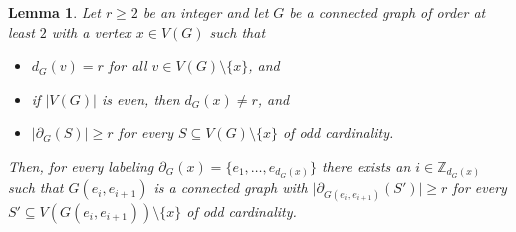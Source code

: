 \documentclass[a4paper,11pt]{article}
\newtheorem{lem}[defi]{Lemma}
\theoremstyle{remark}
\begin{document}
\begin{lem}\label{Lem:r-graph lifting}
	Let $ r \geq 2$ be an integer and let $G$ be a connected graph of order at least $ 2 $ with a vertex $x \in V(G)$ such that
	\begin{itemize}
		\item $d_G(v)=r$ for all $v \in V(G)\setminus\{x\}$, and
		\item if $\vert V(G) \vert$ is even, then $d_G(x)\neq r$, and
		\item $\vert \partial_G(S) \vert \geq r$ for every $S\subseteq V(G)\setminus\{x\}$ of odd cardinality.
	\end{itemize}
	Then, for every labeling $\partial_G(x)=\{e_1,\ldots, e_{d_G(x)}\}$ there exists an  $i \in \mathbb{Z}_{d_G(x)}$ such that $G(e_i,e_{i+1})$ is a connected graph with $\vert \partial_{G(e_i,e_{i+1})}(S') \vert \geq r$ for every $S'\subseteq V(G(e_i,e_{i+1}))\setminus\{x\}$ of odd cardinality.
\end{lem}
\end{document}

